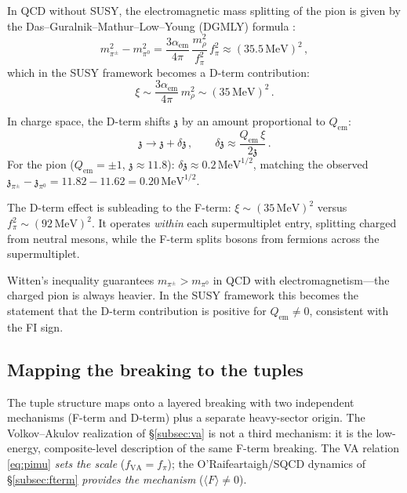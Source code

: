 \documentclass[12pt,a4paper]{article}
\newcommand{\MeV}{\,\text{MeV}}
\newcommand{\zch}{\mathfrak{z}}
\begin{document}
In QCD without SUSY, the electromagnetic mass splitting of the 
pion is given by the Das--Guralnik--Mathur--Low--Young (DGMLY) 
formula \cite{DGMLY1967}:
\begin{equation}
m_{\pi^\pm}^2 - m_{\pi^0}^2 = \frac{3\alpha_{\text{em}}}{4\pi}\,
\frac{m_\rho^2}{f_\pi^2}\,f_\pi^2 
\approx (35.5\MeV)^2\,,
\end{equation}
which in the SUSY framework becomes a D-term contribution:
\begin{equation}
\xi \sim \frac{3\alpha_{\text{em}}}{4\pi}\,m_\rho^2 
\sim (35\MeV)^2\,.
\end{equation}

In charge space, the D-term shifts $\zch$ by an amount proportional 
to $Q_{\text{em}}$:
\begin{equation}
\zch \to \zch + \delta\zch\,, \qquad 
\delta\zch \approx \frac{Q_{\text{em}}\,\xi}{2\zch}\,.
\end{equation}
For the pion ($Q_{\text{em}} = \pm 1$, $\zch \approx 11.8$): 
$\delta\zch \approx 0.2\MeV^{1/2}$, matching the observed 
$\zch_{\pi^\pm} - \zch_{\pi^0} = 11.82 - 11.62 = 0.20\MeV^{1/2}$.

The D-term effect is subleading to the F-term: 
$\xi \sim (35\MeV)^2$ versus $f_\pi^2 \sim (92\MeV)^2$. It 
operates \emph{within} each supermultiplet entry, splitting charged 
from neutral mesons, while the F-term splits bosons from fermions 
across the supermultiplet.

Witten's inequality \cite{Witten1983} guarantees 
$m_{\pi^\pm} > m_{\pi^0}$ in QCD with electromagnetism---the 
charged pion is always heavier. In the SUSY framework this 
becomes the statement that the D-term contribution is positive 
for $Q_{\text{em}} \neq 0$, consistent with the FI sign.

\subsection{Mapping the breaking to the tuples}
\label{subsec:mapping}

The tuple structure maps onto a layered breaking with two independent 
mechanisms (F-term and D-term) plus a separate heavy-sector origin. 
The Volkov--Akulov realization of \S\ref{subsec:va} is not a third 
mechanism: it is the low-energy, composite-level description of the 
same F-term breaking. The VA relation \eqref{eq:pimu} \emph{sets the 
scale} ($f_{\text{VA}} = f_\pi$); the O'Raifeartaigh/SQCD dynamics 
of \S\ref{subsec:fterm} \emph{provides the mechanism} 
($\langle F\rangle \neq 0$).
\end{document}
